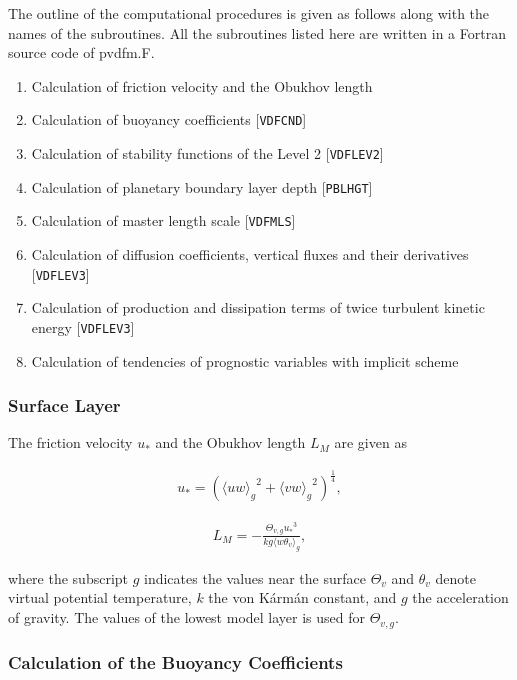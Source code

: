 The outline of the computational procedures is given as follows along
with the names of the subroutines. All the subroutines listed here are
written in a Fortran source code of pvdfm.F.

\begin{enumerate}
\def\labelenumi{\arabic{enumi}.}
\tightlist
\item
  Calculation of friction velocity and the Obukhov length
\item
  Calculation of buoyancy coefficients {[}\texttt{VDFCND}{]}
\item
  Calculation of stability functions of the Level 2
  {[}\texttt{VDFLEV2}{]}
\item
  Calculation of planetary boundary layer depth {[}\texttt{PBLHGT}{]}
\item
  Calculation of master length scale {[}\texttt{VDFMLS}{]}
\item
  Calculation of diffusion coefficients, vertical fluxes and their
  derivatives {[}\texttt{VDFLEV3}{]}
\item
  Calculation of production and dissipation terms of twice turbulent
  kinetic energy {[}\texttt{VDFLEV3}{]}
\item
  Calculation of tendencies of prognostic variables with implicit scheme
\end{enumerate}

\hypertarget{surface-layer}{%
\subsubsection{Surface Layer}\label{surface-layer}}

The friction velocity \(u_*\) and the Obukhov length \(L_M\) are given
as

\begin{eqnarray}u_*=\left({\langle uw \rangle_g}^2+{\langle vw \rangle_g}^2 \right)^\frac{1}{4},\end{eqnarray}

\begin{eqnarray}L_M=-\frac{\Theta_{v,g} {u_*}^3}{kg \langle w\theta_v \rangle_g},\end{eqnarray}

where the subscript \(g\) indicates the values near the surface
\(\Theta_v\) and \(\theta_v\) denote virtual potential temperature,
\(k\) the von Kármán constant, and \(g\) the acceleration of gravity.
The values of the lowest model layer is used for \(\Theta_{v,g}\).

\hypertarget{calculation-of-the-buoyancy-coefficients}{%
\subsubsection{Calculation of the Buoyancy
Coefficients}\label{calculation-of-the-buoyancy-coefficients}}

